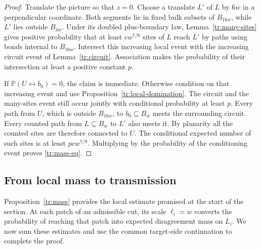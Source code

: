 \begin{proof}
Translate the picture so that $z=0$. Choose a translate $L'$ of $L$
by $6w$ in a perpendicular coordinate. Both segments lie in fixed bulk
subsets of $B_{16w}$, while $L'$ lies outside $B_{4w}$. Under its doubled
plus-boundary law, Lemma~\ref{tr:many-sites} gives positive probability
that at least $c w^{7/8}$ sites of $L$ reach $L'$ by paths using bonds
internal to $B_{16w}$. Intersect this increasing local event with the
increasing circuit event of Lemma~\ref{tr:circuit}.
Association makes the probability of their intersection at least a
positive constant $p$.

If $\mathbb P(U\longleftrightarrow b_0)=0$, the claim is immediate.
Otherwise condition on that increasing event and use
Proposition~\ref{tr:local-domination}. The circuit and the many-sites
event still occur jointly with conditional probability at least $p$.
Every path from $U$, which is outside $B_{16w}$, to $b_0\subseteq B_w$
meets the surrounding circuit. Every counted path from $L\subseteq B_w$
to $L'$ also meets it. By planarity all the counted sites are therefore
connected to $U$. The conditional expected number of such sites is at
least $pc w^{7/8}$. Multiplying by the probability of the conditioning
event proves \eqref{tr:mass-eq}.
\end{proof}

\subsection{From local mass to transmission}
\label{tr:transmission-subsection}

Proposition~\ref{tr:mass} provides the local estimate promised at the
start of the section. At each patch of an admissible cut, its scale
$\ell_i\asymp w$ converts the probability of reaching that patch into
expected disagreement mass on $L_i$. We now sum these estimates and
use the common target-side continuation to complete the proof.

